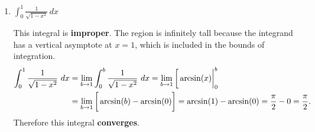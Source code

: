 \begin{enumerate}[leftmargin=0pt]
\begin{enumerate}
    \begin{red}
    This integral is sneakily \textbf{improper} because the integrand has a vertical asymptote at $\pi/2$, which is included in the bounds of integration, so the region is infinitely tall. If you happen to remember that $\int\tan(x)\, dx = \ln|\cos(x)| +C$, you could use that fact, but let's do it by substitution because that's more fun:
    \begin{align*}
        \int_0^{\pi/2} \tan(x)\ dx 
        &= \int_0^{\pi/2} \frac{\sin(x)}{\cos(x)}\ dx 
        = \lim_{b\to \pi/2}\int_0^b\frac{\sin(x)}{\cos(x)}\ dx
        \intertext{So let's substitute $u = \cos(x)$, $du = \sin(x)\ dx$:}
        &= \lim_{b\to \pi/2}\int_{x=0}^{x=b} \frac{1}{u}\ du 
        = \left.\lim_{b\to \pi/2} \ln|u| \right|_{x=0}^{x=b}
        = \left.\lim_{b\to \pi/2} \ln|\cos(x)| \right|_0^b \\
        &= \lim_{b\to \pi/2} \left(\vphantom\int \ln|\cos(b)| - \ln|\cos(0)|\right)
        = \lim_{b\to \pi/2} \left(\vphantom\int\ln|\cos(b)| - \ln(1)\right) \\
        &= \lim_{b\to \pi/2} \left(\vphantom\int \ln|\cos(b)| - 0\right)
    \end{align*}
    And now we see a problem: as $b\to \pi/2$, $\cos(b) \to 0$, and so $\ln|\cos(b)| \to -\infty$. Therefore this integral \textbf{diverges}.
    \end{red}
    \item $\displaystyle \int_0^1 \frac{1}{\sqrt{1-x^2}} \, dx$
    
    \begin{red}
    This integral is \textbf{improper}. The region is infinitely tall because the integrand has a vertical asymptote at $x=1$, which is included in the bounds of integration. 
    \begin{align*}
        \int_0^1\frac{1}{\sqrt{1-x^2}}\ dx 
        &= \lim_{b\to 1} \int_0^b \frac{1}{\sqrt{1-x^2}}\ dx = \lim_{b\to 1}\left[\vphantom\int \arcsin(x)\right|_0^b \\
        &= \lim_{b\to 1} \left[\vphantom\int \arcsin(b) - \arcsin(0) \right] 
        = \arcsin(1) - \arcsin(0) = \frac{\pi}{2} - 0 = \frac{\pi}{2}.
    \end{align*}
    Therefore this integral \textbf{converges}.
    \end{red}
\end{enumerate}

\end{enumerate}


\pagebreak

